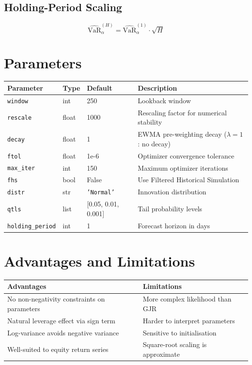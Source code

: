 \documentclass[11pt, a4paper]{article}
\begin{document}
\subsection{Holding-Period Scaling}
\begin{equation}
\widehat{\text{VaR}}_\alpha^{(H)} = \widehat{\text{VaR}}_\alpha^{(1)} \cdot \sqrt{H}
\end{equation}

\section{Parameters}

\begin{tabular}{llll}
\toprule
Parameter & Type & Default & Description \\
\midrule
\texttt{window}   & int   & 250   & Lookback window \\
\texttt{rescale}  & float & 1000  & Rescaling factor for numerical stability \\
\texttt{decay}    & float & 1     & EWMA pre-weighting decay ($\lambda=1$: no decay) \\
\texttt{ftol}     & float & 1e-6  & Optimizer convergence tolerance \\
\texttt{max\_iter}& int   & 150   & Maximum optimizer iterations \\
\texttt{fhs}      & bool  & False & Use Filtered Historical Simulation \\
\texttt{distr}    & str   & \texttt{'Normal'} & Innovation distribution \\
\texttt{qtls}     & list  & [0.05, 0.01, 0.001] & Tail probability levels \\
\texttt{holding\_period} & int & 1 & Forecast horizon in days \\
\bottomrule
\end{tabular}

\section{Advantages and Limitations}

\begin{tabular}{p{6cm} p{8cm}}
\toprule
Advantages & Limitations \\
\midrule
No non-negativity constraints on parameters & More complex likelihood than GJR \\
Natural leverage effect via sign term & Harder to interpret parameters \\
Log-variance avoids negative variance & Sensitive to initialisation \\
Well-suited to equity return series & Square-root scaling is approximate \\
\bottomrule
\end{tabular}
\end{document}
